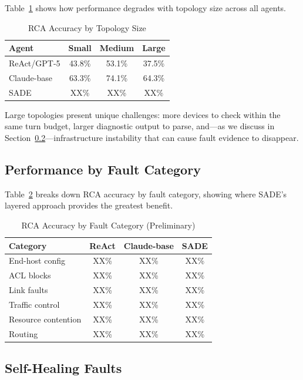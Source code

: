 \documentclass[conference]{IEEEtran}
\begin{document}
Table~\ref{tab:size} shows how performance degrades with topology size across all agents.

\begin{table}[t]
\centering
\caption{RCA Accuracy by Topology Size}
\label{tab:size}
\begin{tabular}{@{}lccc@{}}
\toprule
\textbf{Agent} & \textbf{Small} & \textbf{Medium} & \textbf{Large} \\
\midrule
ReAct/GPT-5 & 43.8\% & 53.1\% & 37.5\% \\
Claude-base & 63.3\% & 74.1\% & 64.3\% \\
SADE & XX\% & XX\% & XX\% \\
\bottomrule
\end{tabular}
\end{table}

Large topologies present unique challenges: more devices to check within the same turn budget, larger diagnostic output to parse, and---as we discuss in Section~\ref{sec:selfhealing}---infrastructure instability that can cause fault evidence to disappear.

\subsection{Performance by Fault Category}

Table~\ref{tab:category} breaks down RCA accuracy by fault category, showing where SADE's layered approach provides the greatest benefit.

\begin{table}[t]
\centering
\caption{RCA Accuracy by Fault Category (Preliminary)}
\label{tab:category}
\begin{tabular}{@{}lccc@{}}
\toprule
\textbf{Category} & \textbf{ReAct} & \textbf{Claude-base} & \textbf{SADE} \\
\midrule
End-host config & XX\% & XX\% & XX\% \\
ACL blocks & XX\% & XX\% & XX\% \\
Link faults & XX\% & XX\% & XX\% \\
Traffic control & XX\% & XX\% & XX\% \\
Resource contention & XX\% & XX\% & XX\% \\
Routing & XX\% & XX\% & XX\% \\
\bottomrule
\end{tabular}
\end{table}

\subsection{Self-Healing Faults}
\label{sec:selfhealing}
\end{document}
